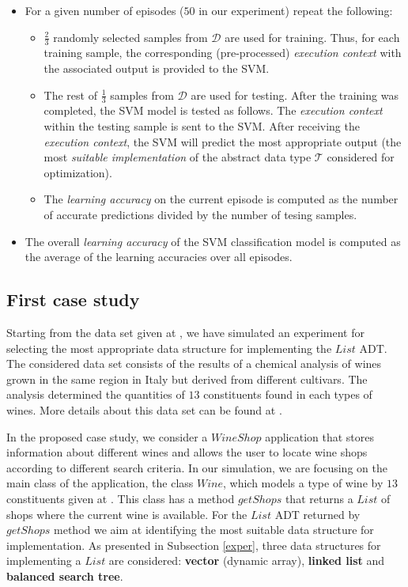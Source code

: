 \begin{itemize}

\item  For a given number of episodes ($50$ in our experiment) repeat the following:

\begin{itemize}

\item $\frac{2}{3}$ randomly selected samples from $\mathcal{D}$ are used for training. Thus, for each training sample, the corresponding (pre-processed) \emph{execution context} with the associated output is provided to the SVM.  

\item The rest of $\frac{1}{3}$ samples from $\mathcal{D}$ are used for testing. After the training was completed, the SVM model is tested as follows. The \emph{execution context} within the testing sample is sent to the SVM. After receiving the \emph{execution context}, the SVM will predict the most appropriate output (the most \emph{suitable implementation} of the abstract data type $\mathcal{T}$ considered for optimization).     
\item The \emph{learning accuracy} on the current episode is computed as the number of accurate predictions divided by the number of tesing samples. 

\end{itemize}

\item The overall \emph{learning accuracy} of the SVM classification model is computed as the average of the learning accuracies over all episodes. 

\end{itemize}   

\subsection{First case study}\label{cs}

Starting from the data set given at \cite{forina}, we have simulated an experiment for selecting the most appropriate data structure for implementing the $List$ ADT. The considered data set consists of the results of a chemical analysis of wines grown in the same region in Italy but derived from  different cultivars. The analysis determined the quantities of $13$ constituents found in each types of wines. More details about this data set can be found at \cite{website:wine}.

In the proposed case study, we consider a $WineShop$ application that stores information about different wines and allows the user to locate wine shops according to different search criteria. In our simulation, we are focusing on the main class of the application, the class $Wine$, which models a type of wine by $13$ constituents given at \cite{website:wine}. This class has a method $getShops$ that returns a $List$ of shops where the current wine is available. For the $List$ ADT returned by $getShops$ method we aim at identifying the most suitable data structure for implementation.  As presented in Subsection \ref{exper}, three data structures for implementing a $List$ are considered: \textbf{vector} (dynamic array), \textbf{linked list} and \textbf{balanced search tree}. 

